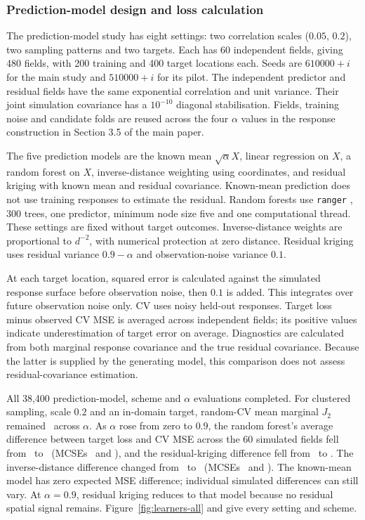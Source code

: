 \documentclass[11pt,a4paper]{article}
\begin{document}
\subsubsection{Prediction-model design and loss calculation}
\label{sec:learner-details}
The prediction-model study has eight settings: two correlation scales ($0.05$, $0.2$), two sampling patterns and two targets. Each has 60 independent fields, giving 480 fields, with 200 training and 400 target locations each. Seeds are $610000+i$ for the main study and $510000+i$ for its pilot. The independent predictor and residual fields have the same exponential correlation and unit variance. Their joint simulation covariance has a $10^{-10}$ diagonal stabilisation. Fields, training noise and candidate folds are reused across the four $\alpha$ values in the response construction in Section 3.5 of the main paper.

The five prediction models are the known mean $\sqrt{\alpha}X$, linear regression on $X$, a random forest on $X$, inverse-distance weighting using coordinates, and residual kriging with known mean and residual covariance. Known-mean prediction does not use training responses to estimate the residual. Random forests use \texttt{ranger} \citep{wright2017ranger}, 300 trees, one predictor, minimum node size five and one computational thread. These settings are fixed without target outcomes. Inverse-distance weights are proportional to $d^{-2}$, with numerical protection at zero distance. Residual kriging uses residual variance $0.9-\alpha$ and observation-noise variance $0.1$.

At each target location, squared error is calculated against the simulated response surface before observation noise, then $0.1$ is added. This integrates over future observation noise only. CV uses noisy held-out responses. Target loss minus observed CV MSE is averaged across independent fields; its positive values indicate underestimation of target error on average. Diagnostics are calculated from both marginal response covariance and the true residual covariance. Because the latter is supplied by the generating model, this comparison does not assess residual-covariance estimation.

All 38,400 prediction-model, scheme and $\alpha$ evaluations completed. For clustered sampling, scale $0.2$ and an in-domain target, random-CV mean marginal $J_2$ remained \ConstantMarginal\ across $\alpha$. As $\alpha$ rose from zero to $0.9$, the random forest's average difference between target loss and CV MSE across the 60 simulated fields fell from \ForestZero\ to \ForestNine\ (MCSEs \ForestZeroSE\ and \ForestNineSE), and the residual-kriging difference fell from \KrigingZero\ to \KrigingNine. The inverse-distance difference changed from \IDWZero\ to \IDWNine\ (MCSEs \IDWZeroSE\ and \IDWNineSE). The known-mean model has zero expected MSE difference; individual simulated differences can still vary. At $\alpha=0.9$, residual kriging reduces to that model because no residual spatial signal remains. Figure~\ref{fig:learners-all} and  give every setting and scheme.
\end{document}
